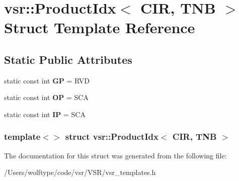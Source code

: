 \hypertarget{structvsr_1_1_product_idx_3_01_c_i_r_00_01_t_n_b_01_4}{\section{vsr\-:\-:Product\-Idx$<$ C\-I\-R, T\-N\-B $>$ Struct Template Reference}
\label{structvsr_1_1_product_idx_3_01_c_i_r_00_01_t_n_b_01_4}
}
\subsection*{Static Public Attributes}
\begin{DoxyCompactItemize}
\item 
\hypertarget{structvsr_1_1_product_idx_3_01_c_i_r_00_01_t_n_b_01_4_af3182a6b5aff5e966bc85dffa33bd40d}{static const int {\bfseries G\-P} = R\-V\-D}\label{structvsr_1_1_product_idx_3_01_c_i_r_00_01_t_n_b_01_4_af3182a6b5aff5e966bc85dffa33bd40d}

\item 
\hypertarget{structvsr_1_1_product_idx_3_01_c_i_r_00_01_t_n_b_01_4_af4cacb43af92a86174cd7993ec378a2b}{static const int {\bfseries O\-P} = S\-C\-A}\label{structvsr_1_1_product_idx_3_01_c_i_r_00_01_t_n_b_01_4_af4cacb43af92a86174cd7993ec378a2b}

\item 
\hypertarget{structvsr_1_1_product_idx_3_01_c_i_r_00_01_t_n_b_01_4_ad92175bf810bf18eb13819479ed5d2db}{static const int {\bfseries I\-P} = S\-C\-A}\label{structvsr_1_1_product_idx_3_01_c_i_r_00_01_t_n_b_01_4_ad92175bf810bf18eb13819479ed5d2db}

\end{DoxyCompactItemize}
\subsubsection*{template$<$$>$ struct vsr\-::\-Product\-Idx$<$ C\-I\-R, T\-N\-B $>$}



The documentation for this struct was generated from the following file\-:\begin{DoxyCompactItemize}
\item 
/\-Users/wolftype/code/vsr/\-V\-S\-R/vsr\-\_\-templates.\-h\end{DoxyCompactItemize}
